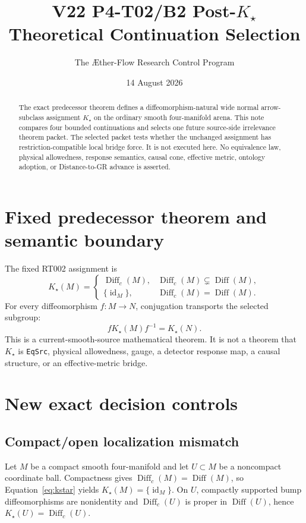 \documentclass[11pt]{article}
\title{V22 P4-T02/B2 Post-$K_{\star}$\\Theoretical Continuation Selection}
\author{The \AE ther-Flow Research Control Program}
\date{14 August 2026}
\newcommand{\Diff}{\operatorname{Diff}}
\newcommand{\Diffc}{\operatorname{Diff}_{c}}
\newcommand{\Kstar}{K_{\star}}
\begin{document}
\maketitle

\begin{abstract}
The exact predecessor theorem defines a diffeomorphism-natural wide normal
arrow-subclass assignment \(\Kstar\) on the ordinary smooth four-manifold
arena.  This note compares four bounded continuations and selects one future
source-side irrelevance theorem packet.  The selected packet tests whether the
unchanged assignment has restriction-compatible local bridge force.  It is
not executed here.  No equivalence law, physical allowedness, response
semantics, causal cone, effective metric, ontology adoption, or
Distance-to-GR advance is asserted.
\end{abstract}

\section{Fixed predecessor theorem and semantic boundary}

The fixed RT002 assignment is
\begin{equation}
\Kstar(M)=
\begin{cases}
\Diffc(M),&\Diffc(M)\subsetneq\Diff(M),\\
\{\operatorname{id}_M\},&\Diffc(M)=\Diff(M).
\end{cases}
\label{eq:kstar}
\end{equation}
For every diffeomorphism \(f:M\to N\), conjugation transports the selected
subgroup:
\begin{equation}
 f\Kstar(M)f^{-1}=\Kstar(N).
\end{equation}
This is a current-smooth-source mathematical theorem.  It is not a theorem
that \(\Kstar\) is \texttt{EqSrc}, physical allowedness, gauge, a detector
response map, a causal structure, or an effective-metric bridge.

\section{New exact decision controls}

\subsection{Compact/open localization mismatch}

Let \(M\) be a compact smooth four-manifold and let \(U\subset M\) be a
noncompact coordinate ball.  Compactness gives
\(\Diffc(M)=\Diff(M)\), so Equation~\eqref{eq:kstar} yields
\(\Kstar(M)=\{\operatorname{id}_M\}\).  On \(U\), compactly supported bump
diffeomorphisms are nonidentity and \(\Diffc(U)\) is proper in
\(\Diff(U)\), hence \(\Kstar(U)=\Diffc(U)\).
\end{document}
